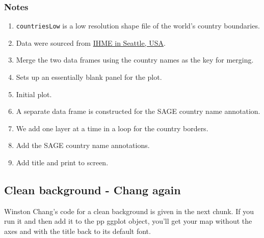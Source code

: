 \documentclass[titlepage]{book}\usepackage{knitr}
\begin{document}
\subsubsection{Notes}
\begin{enumerate}
\item{\texttt{countriesLow} is a low resolution shape file of the world's country boundaries.}
\item{Data were sourced from \href{http://www.healthdata.org/gbd/data}{IHME in Seattle, USA}. }
\item{Merge the two data frames using the country names as the key for merging. }
\item{Sets up an essentially blank panel for the plot.}
\item{Initial plot.}
\item{A separate data frame is constructed for the SAGE country name annotation.}
\item{We add one layer at a time in a loop for the country borders.}
\item{Add the SAGE country name annotations.}
\item{Add title and print to screen.}
\end{enumerate}

\subsection{Clean background - Chang again}
Winston Chang's code for a clean background is given in the next chunk.  If you run it and then add it to the pp ggplot object, you'll get your map without the axes and with the title back to its default font.

\begin{knitrout}
\color{fgcolor}
\end{knitrout}
\end{document}
